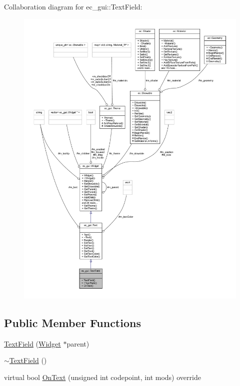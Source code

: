 Collaboration diagram for ec\+\_\+gui\+:\+:Text\+Field\+:
\nopagebreak
\begin{figure}[H]
\begin{center}
\leavevmode
\includegraphics[width=350pt]{classec__gui_1_1_text_field__coll__graph}
\end{center}
\end{figure}
\subsection*{Public Member Functions}
\begin{DoxyCompactItemize}
\item 
\mbox{\hyperlink{classec__gui_1_1_text_field_a82c3e427aaa37f5a53a7561ef3d2e58e}{Text\+Field}} (\mbox{\hyperlink{classec__gui_1_1_widget}{Widget}} $\ast$parent)
\item 
\mbox{\hyperlink{classec__gui_1_1_text_field_a9c43ada308dc59b5a8728cc08cd8d8cb}{$\sim$\+Text\+Field}} ()
\item 
virtual bool \mbox{\hyperlink{classec__gui_1_1_text_field_a62a9512be0b6d2bf6b79f6e4aeadc9b3}{On\+Text}} (unsigned int codepoint, int mods) override
\end{DoxyCompactItemize}
